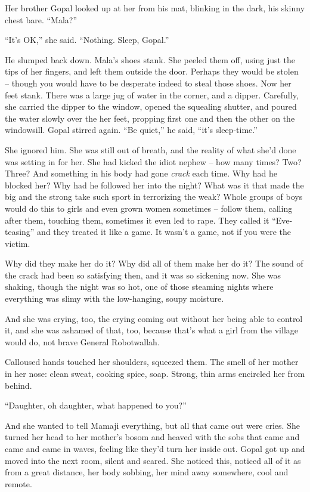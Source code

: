 Her brother Gopal looked up at her from his mat, blinking in the
dark, his skinny chest bare. ``Mala?''

``It's OK,'' she said. ``Nothing. Sleep, Gopal.''

He slumped back down. Mala's shoes stank. She peeled them off,
using just the tips of her fingers, and left them outside the door.
Perhaps they would be stolen -- though you would have to be
desperate indeed to steal those shoes. Now her feet stank. There
was a large jug of water in the corner, and a dipper. Carefully,
she carried the dipper to the window, opened the squealing shutter,
and poured the water slowly over the her feet, propping first one
and then the other on the windowsill. Gopal stirred again. ``Be
quiet,'' he said, ``it's sleep-time.''

She ignored him. She was still out of breath, and the reality of
what she'd done was setting in for her. She had kicked the idiot
nephew -- how many times? Two? Three? And something in his body had
gone \emph{crack} each time. Why had he blocked her? Why had he
followed her into the night? What was it that made the big and the
strong take such sport in terrorizing the weak? Whole groups of
boys would do this to girls and even grown women sometimes --
follow them, calling after them, touching them, sometimes it even
led to rape. They called it ``Eve-teasing'' and they treated it like
a game. It wasn't a game, not if you were the victim.

Why did they make her do it? Why did all of them make her do it?
The sound of the crack had been so satisfying then, and it was so
sickening now. She was shaking, though the night was so hot, one of
those steaming nights where everything was slimy with the
low-hanging, soupy moisture.

And she was crying, too, the crying coming out without her being
able to control it, and she was ashamed of that, too, because
that's what a girl from the village would do, not brave General
Robotwallah.

Calloused hands touched her shoulders, squeezed them. The smell of
her mother in her nose: clean sweat, cooking spice, soap. Strong,
thin arms encircled her from behind.

``Daughter, oh daughter, what happened to you?''

And she wanted to tell Mamaji everything, but all that came out
were cries. She turned her head to her mother's bosom and heaved
with the sobs that came and came and came in waves, feeling like
they'd turn her inside out. Gopal got up and moved into the next
room, silent and scared. She noticed this, noticed all of it as
from a great distance, her body sobbing, her mind away somewhere,
cool and remote.

